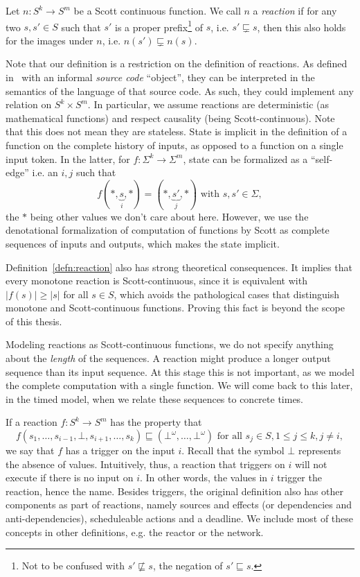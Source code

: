 \begin{defn}[Reaction]
    \label{defn:reaction}
Let $n : S^k \rightarrow S^m$ be a Scott continuous function. 
We call $n$ a \emph{reaction} if for any two $s, s' \in S$ such that $s'$ is a proper prefix\footnote{Not to be confused with $s' \not \sqsubseteq s$, the negation of $s' \sqsubseteq s$.} of $s$, i.e. $s' \sqsubsetneq s$, then this also holds for the images under $n$, i.e. $n(s') \sqsubsetneq n(s)$.
\end{defn}

Note that our definition is a restriction on the definition of reactions.
As defined in~\cite{lohstroh_cyphy19} with an informal \emph{source code} ``object'', they can be interpreted in the semantics of the language of that source code.
As such, they could implement any relation on $S^k \times S^m$.
In particular, we assume reactions are deterministic (as mathematical functions) and respect causality (being Scott-continuous).
Note that this does not mean they are stateless.
State is implicit in the definition of a function on the complete history of inputs, as opposed to a function on a single input token.
In the latter, for $f : \Sigma^k \rightarrow \Sigma^m$, state can be formalized as a ``self-edge'' i.e. an $i,j$ such that
\[ f(*,\underbrace{s}_{i},*) = (*,\underbrace{s'}_{j},*) \text{ with } s ,s' \in \Sigma, \]
the $*$ being other values we don't care about here.
However, we use the denotational formalization of computation of functions by Scott as complete sequences of inputs and outputs, which makes the state implicit.

Definition~\ref{defn:reaction} also has strong theoretical consequences.
It implies that every monotone reaction is Scott-continuous, since it is equivalent with $|f(s)| \geq |s|$ for all $s \in S$, which avoids the pathological cases that distinguish monotone and Scott-continuous functions.
Proving this fact is beyond the scope of this thesis.

Modeling reactions as Scott-continuous functions, we do not specify anything about the \emph{length} of the sequences.
A reaction might produce a longer output sequence than its input sequence. At this stage this is not important, as we model the complete computation with a single function.
We will come back to this later, in the timed model, when we relate these sequences to concrete times.

If a reaction $f : S^k \rightarrow S^m$ has the property that
\[ f(s_1,\ldots,s_{i-1},\bot,s_{i+1},\ldots,s_k) \sqsubseteq (\bot^\omega,\ldots,\bot^\omega)\text{ for all }s_j \in S, 1 \leq j \leq k, j \neq i,\]
 we say that $f$ has a trigger on the input $i$.
Recall that the symbol $\bot$ represents the absence of values.
Intuitively, thus, a reaction that triggers on $i$ will not execute if there is no input on $i$.
In other words, the values in $i$ trigger the reaction, hence the name.
Besides triggers, the original definition also has other components as part of reactions, namely sources and effects (or dependencies and anti-dependencies), scheduleable actions and a deadline.
We include most of these concepts in other definitions, e.g. the reactor or the network.

